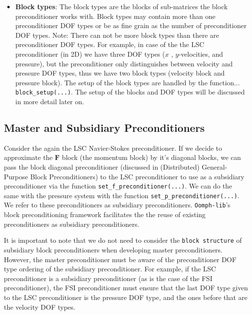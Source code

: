 \begin{itemize}
\item \textbf{Block types}: The block types are the blocks of sub-matrices the block preconditioner works with. Block types may contain more than one preconditioner DOF types or be as fine grain as the number of preconditioner DOF types. Note: There can not be more block types than there are preconditioner DOF types. For example, in case of the the LSC preconditioner (in 2D) we have three DOF types ($x$ , $y$-velocities, and pressure), but the preconditioner only distinguishes between velocity and pressure DOF types, thus we have two block types (velocity block and pressure block). The setup of the block types are handled by the function... \verb+block_setup(...)+. The setup of the blocks and DOF types will be discussed in more detail later on.
\end{itemize}


\subsection{Master and Subsidiary Preconditioners\label{sec:master_and_subsidiary_preconditioners}}
Consider the again the LSC Navier-Stokes preconditioner.
If we decide to approximate the $\mathbf{F}$ block (the momentum block) by it's diagonal blocks, we can pass the block diagonal preconditioner (discussed in (Distributed) General-Purpose Block Preconditioners) to the LSC preconditioner to use as a subsidiary preconditioner via the function \verb+set_f_preconditioner(...)+. We can do the same with the pressure system with the function \verb+set_p_preconditioner(...)+. We refer to these preconditioners as subsidiary preconditioners. \verb+Oomph-lib+'s block preconditioning framework facilitates the the reuse of existing preconditioners as subsidiary preconditioners.

It is important to note that we do not need to consider the \verb+block structure+ of subsidiary block preconditioners when developing master preconditioners. However, the master preconditioner must be aware of the preconditioner DOF type ordering of the subsidiary preconditioner. For example, if the LSC preconditioner is a subsidiary preconditioner (as is the case of the FSI preconditioner), the FSI preconditioner must ensure that the last DOF type given to the LSC preconditioner is the pressure DOF type, and the ones before that are the velocity DOF types.

